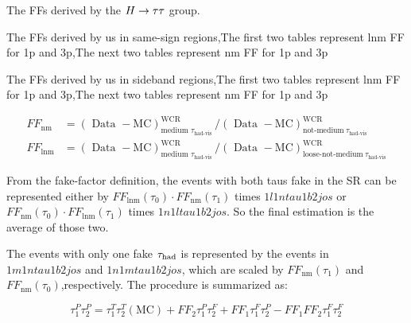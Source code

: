 \begin{table}
\caption{The FFs derived by the $H \rightarrow \tau\tau$ group.}
\label{tab:FF_htautau}

\end{table}


\begin{table}
\caption{The FFs derived by us in same-sign regions,The first two tables represent lnm FF for 1p and 3p,The next two tables represent nm FF for 1p and 3p }
\label{tab:FF_sys_ss}
%

\end{table}


\begin{table}
\caption{The FFs derived by us in sideband regions,The first two tables represent lnm FF for 1p and 3p,The next two tables represent nm FF for 1p and 3p }
\label{tab:FF_sys_sb}
%

\end{table}





\begin{equation}
\label{eq:hadhad_FF}
\begin{aligned}
F F_{\mathrm{nm}}&=(\text { Data }-\mathrm{MC})_{\text {medium } \tau_{\text {had-vis }}}^{\mathrm{WCR}} /(\text { Data }-\mathrm{MC})_{\text {not-medium}\ \tau_{\text{had-vis}}}^{\mathrm{WCR}}
\\
F F_{\mathrm{lnm}}&=(\text { Data }-\mathrm{MC})_{\text {medium } \tau_{\text {had-vis }}}^{\mathrm{WCR}} /(\text { Data }-\mathrm{MC})_{\text {loose-not-medium}\ \tau_{\text{had-vis}}}^{\mathrm{WCR}}
\end{aligned}
\end{equation}

From the fake-factor definition, the events with both taus fake in the SR can be represented either by $F F_{\operatorname{lnm}}\left(\tau_{0}\right) \cdot F F_{\mathrm{nm}}\left(\tau_{1}\right)$ times $1l1ntau1b2jos$ or $F F_{\mathrm{nm}}\left(\tau_{0}\right) \cdot F F_{\mathrm{lnm}}\left(\tau_{1}\right)$ times $1n1ltau1b2jos$. So the final estimation is the average of those two.

The events with only one fake $\tau_\text{had}$ is represented by the events in $1m1ntau1b2jos$ and $1n1mtau1b2jos$, which are scaled by $F F_{\mathrm{nm}}\left(\tau_{1}\right)$ and $F F_{\mathrm{nm}}\left(\tau_{0}\right)$,respectively. The procedure is summarized as:

\begin{equation}
\tau_{1}^{P} \tau_{2}^{P}=\tau_{1}^{T} \tau_{2}^{T}(\mathrm{MC})+F F_{2} \tau_{1}^{P} \tau_{2}^{F}+F F_{1} \tau_{1}^{F} \tau_{2}^{P}-F F_{1} F F_{2} \tau_{1}^{F} \tau_{2}^{F}
\end{equation}

